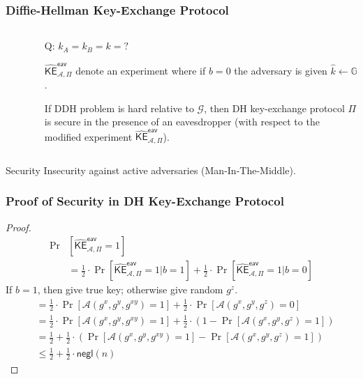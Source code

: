\begin{frame}\frametitle{Diffie-Hellman Key-Exchange Protocol}
\begin{columns}[h]
\begin{column}{5cm}
\begin{figure}
\begin{center}

\end{center}
\end{figure}
\end{column}
\begin{column}{6cm}
\alert{Q: $k_A = k_B = k = ?$}
\newline
	
$\widehat{\mathsf{KE}}^{\mathsf{eav}}_{\mathcal{A},\Pi}$ denote an experiment where if $b=0$ the adversary is given $\hat{k} \gets \mathbb{G}$.
\begin{theorem}
If DDH problem is hard relative to $\mathcal{G}$, then DH key-exchange protocol $\Pi$ is secure in the presence of an eavesdropper (with respect to the modified experiment $\widehat{\mathsf{KE}}^{\mathsf{eav}}_{\mathcal{A},\Pi}$). 
\end{theorem}
\end{column}
\end{columns}
\begin{alertblock}{Security}
Insecurity against active adversaries (Man-In-The-Middle).
\end{alertblock}
\end{frame}
\begin{frame}\frametitle{Proof of Security in DH Key-Exchange Protocol}
\begin{proof}
\begin{align*}
\Pr & \left[ \widehat{\mathsf{KE}}^{\mathsf{eav}}_{\mathcal{A},\Pi} =1\right] \\	
&= \frac{1}{2}\cdot \Pr\left[ \widehat{\mathsf{KE}}^{\mathsf{eav}}_{\mathcal{A},\Pi} =1 | b=1\right] + \frac{1}{2}\cdot \Pr\left[ \widehat{\mathsf{KE}}^{\mathsf{eav}}_{\mathcal{A},\Pi} =1 | b=0\right]
\end{align*}
If $b=1$, then give true key; otherwise give random $g^z$.
\begin{align*}
&= \frac{1}{2}\cdot \Pr\left[ \mathcal{A}(g^x,g^y,g^{xy})=1 \right] + \frac{1}{2}\cdot \Pr\left[ \mathcal{A}(g^x,g^y,g^z)=0 \right]\\
&= \frac{1}{2}\cdot \Pr\left[ \mathcal{A}(g^x,g^y,g^{xy})=1 \right] + \frac{1}{2}\cdot (1-\Pr\left[ \mathcal{A}(g^x,g^y,g^z)=1 \right])\\
&= \frac{1}{2} + \frac{1}{2}\cdot \left( \Pr\left[ \mathcal{A}(g^x,g^y,g^{xy})=1 \right] - \Pr\left[ \mathcal{A}(g^x,g^y,g^z)=1 \right] \right)\\
&\le \frac{1}{2} + \frac{1}{2}\cdot \mathsf{negl}(n) %
\end{align*}
\end{proof}
\end{frame}
